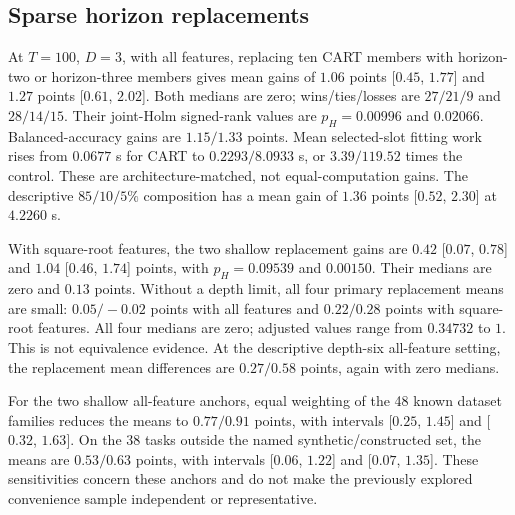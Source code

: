 \subsection{Sparse horizon replacements}
At $T=100$, $D=3$, with all features, replacing ten CART members with
horizon-two or horizon-three members gives mean gains of $1.06$ points
[$0.45$, $1.77$] and $1.27$ points [$0.61$, $2.02$]. Both medians
are zero; wins/ties/losses are $27/21/9$ and $28/14/15$.
Their joint-Holm signed-rank values are $p_H=0.00996$ and $0.02066$.
Balanced-accuracy gains are $1.15/1.33$ points. Mean selected-slot
fitting work rises from $0.0677$ s for CART to $0.2293/8.0933$ s,
or $3.39/119.52$ times the control. These are architecture-matched,
not equal-computation gains. The descriptive $85/10/5\%$ composition
has a mean gain of $1.36$ points [$0.52$, $2.30$] at $4.2260$ s.

With square-root features, the two shallow replacement gains are
$0.42$ [$0.07$, $0.78$] and $1.04$ [$0.46$, $1.74$] points,
with $p_H=0.09539$ and $0.00150$. Their medians are zero and
$0.13$ points. Without a depth limit, all four primary replacement
means are small: $0.05/-0.02$ points with all features and
$0.22/0.28$ points with square-root features. All four medians are
zero; adjusted values range from $0.34732$ to $1$. This is not
equivalence evidence. At the descriptive depth-six all-feature
setting, the replacement mean differences are $0.27/0.58$ points,
again with zero medians.

For the two shallow all-feature anchors, equal weighting of the 48
known dataset families reduces the means to $0.77/0.91$ points,
with intervals [$0.25$, $1.45$] and [$0.32$, $1.63$]. On the 38
tasks outside the named synthetic/constructed set, the means are
$0.53/0.63$ points, with intervals [$0.06$, $1.22$] and [$0.07$,
$1.35$]. These sensitivities concern these anchors and do not make
the previously explored convenience sample independent or representative.

